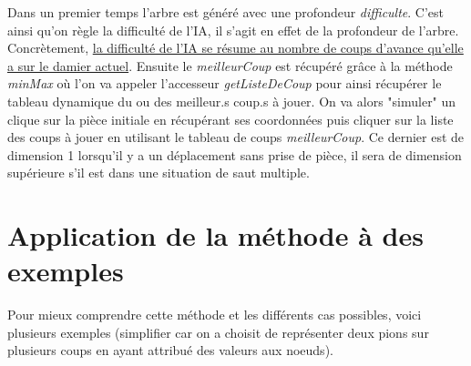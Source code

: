\documentclass[12,french]{report}
\begin{document}

Dans un premier temps l'arbre est généré avec une profondeur \textit{difficulte}. C'est ainsi qu'on règle la difficulté de l'IA, il s'agit en effet de la profondeur de l'arbre. Concrètement, \uline{la difficulté de l'IA se résume au nombre de coups d'avance qu'elle a sur le damier actuel}. Ensuite le \textit{meilleurCoup} est récupéré grâce à la méthode \textit{minMax} où l'on va appeler l'accesseur \textit{getListeDeCoup} pour ainsi récupérer le tableau dynamique du ou des meilleur.s coup.s à jouer. On va alors "simuler" un clique sur la pièce initiale en récupérant ses coordonnées puis cliquer sur la liste des coups à jouer en utilisant le tableau de coups \textit{meilleurCoup}. Ce dernier est de dimension 1 lorsqu'il y a un déplacement sans prise de pièce, il sera de dimension supérieure s'il est dans une situation de saut multiple.

\section{Application de la méthode à des exemples}

Pour mieux comprendre cette méthode et les différents cas possibles,
voici plusieurs exemples (simplifier car on a choisit de représenter
deux pions sur plusieurs coups en ayant attribué des valeurs aux noeuds).
\end{document}

